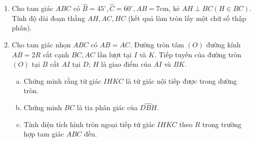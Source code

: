 \begin{ex}%
\hfill
\begin{enumerate}[1)]
	\item Cho tam giác $ABC$ có $\widehat{B}=45^\circ, \widehat{C}=60^\circ, AB=7$cm, kẻ $AH \perp BC (H\in BC)$. Tính độ dài đoạn thẳng $AH, AC, HC$ (kết quả làm tròn lấy một chữ số thập phân).
	\item Cho tam giác nhọn $ABC$ có $AB=AC$. Đường tròn tâm $(O)$ đường kính $AB=2R$ cắt cạnh $BC, AC$ lần lượt tại $I$ và $K$. Tiếp tuyến của đường tròn $(O)$ tại $B$ cắt $AI$ tại $D$; $H$ là giao điểm của $AI$ và $BK$.   
	\begin{enumerate}[a)]
		\item Chứng minh rằng tứ giác $IHKC$ là tứ giác nội tiếp được trong đường tròn.
		\item Chứng minh $BC$ là tia phân giác của $\widehat{DBH}$.
		\item Tính diện tích hình tròn ngoại tiếp tứ giác $IHKC$ theo $R$ trong trường hợp tam giác $ABC$ đều.
	\end{enumerate}
\end{enumerate}
\loigiai
    {
\begin{center}
\end{center}}
\end{ex}
